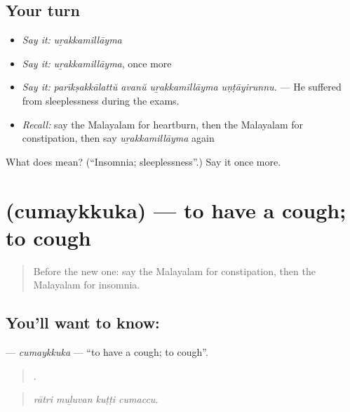 \subsection*{Your turn}
\begin{itemize}
\raggedright
  \item \emph{Say it:} \emph{uṟakkamillāyma}
  \item \emph{Say it:} \emph{uṟakkamillāyma}, once more
  \item \emph{Say it:} \emph{parīkṣakkālattŭ avanŭ uṟakkamillāyma uṇṭāyirunnu.} — He suffered from sleeplessness during the exams.
  \item \emph{Recall:} say the Malayalam for heartburn, then the Malayalam for constipation, then say \emph{uṟakkamillāyma} again
\end{itemize}

\begin{tcolorbox}[breakable,colback=teal!4,colframe=teal!35!black,title={Before you move on}]
What does  mean? (\textquotedblleft{}Insomnia; sleeplessness\textquotedblright{}.) Say it once more.
\end{tcolorbox}
\section[\texorpdfstring{\ml{ചുമയ്ക്കുക} (cumaykkuka)}{ചുമയ്ക്കുക (cumaykkuka)}]{ (cumaykkuka) — to have a cough; to cough}

\label{lesson:ML-C534-cumaykkuka}



\begin{quote}
Before the new one: say the Malayalam for constipation, then the Malayalam for insomnia.
\end{quote}

\subsection*{You'll want to know: }
\textbf{} — \emph{cumaykkuka} — \textquotedblleft{}to have a cough; to cough\textquotedblright{}.

\begin{quote}
   .
\end{quote}

\begin{quote}
\emph{rātri muḻuvan kuṭṭi cumaccu.}
\end{quote}

